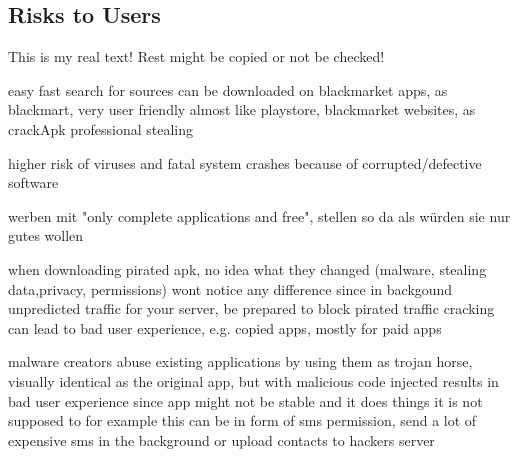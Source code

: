 \subsection{Risks to Users} \label{subsection:foundation-piracy-users}
This is my real text! Rest might be copied or not be checked!

easy fast search for sources
can be downloaded on blackmarket apps, as blackmart\cite{blackmartStore}, very user friendly almost like playstore, blackmarket websites, as crackApk\cite{crackApk}
professional stealing

higher risk of viruses and fatal system crashes because of corrupted/defective software

werben mit "only complete applications and free", stellen so da als würden sie nur gutes wollen

when downloading pirated apk, no idea what they changed (malware, stealing data,privacy, permissions)
wont notice any difference since in backgound
unpredicted traffic for your server, be prepared to block pirated traffic
cracking can lead to bad user experience, e.g. copied apps, mostly for paid apps

malware creators abuse existing applications by using them as trojan horse, visually identical as the original app, but with malicious code injected
results in bad user experience since app might not be stable and it does things it is not supposed to
for example this can be in form of sms permission, send a lot of expensive sms in the background or upload contacts to hackers server\cite{bitdefenderPlagiarism}\cite{lierschDeveloperThreats}
